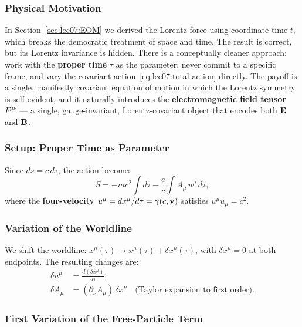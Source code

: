 \subsubsection*{Physical Motivation}

In Section~\ref{sec:lec07:EOM} we derived the Lorentz force using coordinate
time $t$, which breaks the democratic treatment of space and time.  The result
is correct, but its Lorentz invariance is hidden.  There is a conceptually
cleaner approach: work with the \textbf{proper time} $\tau$ as the parameter,
never commit to a specific frame, and vary the covariant
action~\eqref{eq:lec07:total-action} directly.  The payoff is a single,
manifestly covariant equation of motion in which the Lorentz symmetry is
self-evident, and it naturally introduces the \textbf{electromagnetic field
tensor} $F^{\mu\nu}$ — a single, gauge-invariant, Lorentz-covariant object that
encodes both $\mathbf{E}$ and $\mathbf{B}$.

\subsubsection*{Setup: Proper Time as Parameter}

Since $ds = c\,d\tau$, the action becomes
\begin{equation}\label{eq:lec07:action-proper}
    S = -mc^2\int d\tau - \frac{e}{c}\int A_\mu\,u^\mu\,d\tau ,
\end{equation}
where the \textbf{four-velocity} $u^\mu = dx^\mu/d\tau = \gamma(c,\mathbf{v})$
satisfies $u^\mu u_\mu = c^2$.

\subsubsection*{Variation of the Worldline}

We shift the worldline: $x^\mu(\tau) \to x^\mu(\tau) + \delta x^\mu(\tau)$,
with $\delta x^\mu = 0$ at both endpoints.  The resulting changes are:
\begin{align}
    \delta u^\mu &= \frac{d(\delta x^\mu)}{d\tau} ,
    \label{eq:lec07:delta-u}\\
    \delta A_\mu &= (\partial_\nu A_\mu)\,\delta x^\nu
    \quad\text{(Taylor expansion to first order).}
    \label{eq:lec07:delta-A}
\end{align}

\subsubsection*{First Variation of the Free-Particle Term}

